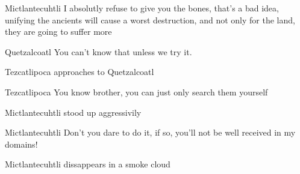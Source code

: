 \documentclass{screenplay}[2012/06/30]
\begin{document}
\begin{dialogue}[angry]{Mictlantecuhtli}
I absolutly refuse to give you the bones, that's a bad idea, unifying the ancients will cause a worst destruction, and not only for the land, they are going to suffer more 
\end{dialogue}


\begin{dialogue}{Quetzalcoatl}
You can't know that unless we try it. 
\end{dialogue}

Tezcatlipoca approaches to Quetzalcoatl
\begin{dialogue}{Tezcatlipoca}
You know brother, you can just only search them yourself
\end{dialogue}

Mictlantecuhtli stood up aggressivily
\begin{dialogue}[angry]{Mictlantecuhtli}
Don't you dare to do it, if so, you'll not be well received in my domains!
\end{dialogue}

Mictlantecuhtli dissappears in a smoke cloud
\end{document}

